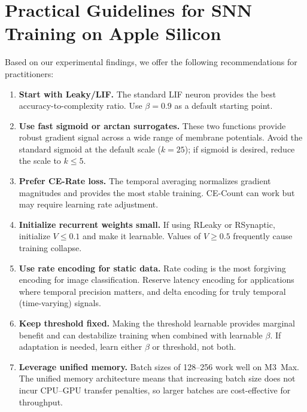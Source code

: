 \documentclass[11pt]{article}
\begin{document}
\section{Practical Guidelines for SNN Training on Apple Silicon}

Based on our experimental findings, we offer the following recommendations for practitioners:

\begin{enumerate}[leftmargin=*]
    \item \textbf{Start with Leaky/LIF.} The standard LIF neuron provides the best accuracy-to-complexity ratio. Use $\beta = 0.9$ as a default starting point.

    \item \textbf{Use fast sigmoid or arctan surrogates.} These two functions provide robust gradient signal across a wide range of membrane potentials. Avoid the standard sigmoid at the default scale ($k=25$); if sigmoid is desired, reduce the scale to $k \leq 5$.

    \item \textbf{Prefer CE-Rate loss.} The temporal averaging normalizes gradient magnitudes and provides the most stable training. CE-Count can work but may require learning rate adjustment.

    \item \textbf{Initialize recurrent weights small.} If using RLeaky or RSynaptic, initialize $V \leq 0.1$ and make it learnable. Values of $V \geq 0.5$ frequently cause training collapse.

    \item \textbf{Use rate encoding for static data.} Rate coding is the most forgiving encoding for image classification. Reserve latency encoding for applications where temporal precision matters, and delta encoding for truly temporal (time-varying) signals.

    \item \textbf{Keep threshold fixed.} Making the threshold learnable provides marginal benefit and can destabilize training when combined with learnable $\beta$. If adaptation is needed, learn either $\beta$ or threshold, not both.

    \item \textbf{Leverage unified memory.} Batch sizes of 128--256 work well on M3~Max. The unified memory architecture means that increasing batch size does not incur CPU--GPU transfer penalties, so larger batches are cost-effective for throughput.
\end{enumerate}
\end{document}
